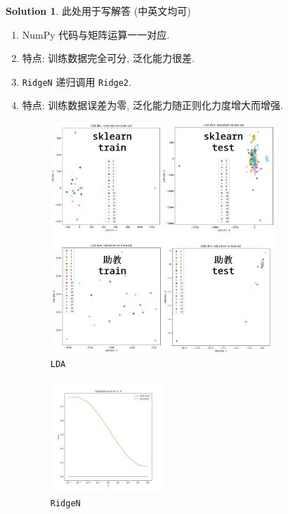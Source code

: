 \documentclass[a4paper]{article}
\numberwithin{equation}{section}
\theoremstyle{definition}
\newtheorem*{solution}{Solution}
\begin{document}
\begin{solution}
    此处用于写解答 (中英文均可)
    \begin{enumerate}
        \item[(1,3)] NumPy 代码与矩阵运算一一对应.
        \item[(2)] 特点: 训练数据完全可分, 泛化能力很差.
        \item[(4)] \texttt{RidgeN} 递归调用 \texttt{Ridge2}.
        \item[(5)] 特点: 训练数据误差为零, 泛化能力随正则化力度增大而增强.
              \begin{figure}
                  \centering
                  \includegraphics[width=0.8\textwidth]{./programming-lda.jpg}
                  \caption{\texttt{LDA}}
              \end{figure}
              \begin{figure}
                  \centering
                  \includegraphics[width=0.4\textwidth]{./programming-ridge.jpg}
                  \caption{\texttt{RidgeN}}
              \end{figure}
    \end{enumerate}
\end{solution}

\newpage

\end{document}
